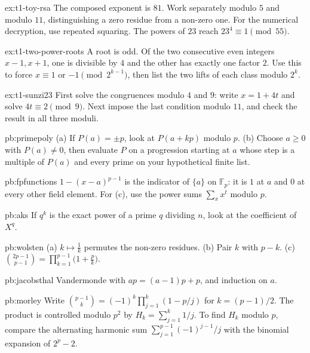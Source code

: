 \begin{hint}{ex:t1-toy-rsa}
The composed exponent is $81$. Work separately modulo $5$ and modulo $11$, distinguishing a zero residue from a non-zero one. For the numerical decryption, use repeated squaring. The powers of $23$ reach $23^4\equiv1\pmod{55}$.
\end{hint}
\begin{hint}{ex:t1-two-power-roots}
A root is odd. Of the two consecutive even integers $x-1,x+1$, one is divisible by $4$ and the other has exactly one factor $2$. Use this to force $x\equiv1$ or $-1\pmod{2^{k-1}}$, then list the two lifts of each class modulo $2^k$.
\end{hint}

\begin{hint}{ex:t1-sunzi23}
First solve the congruences modulo $4$ and $9$: write $x=1+4t$ and solve $4t\equiv2\pmod9$. Next impose the last condition modulo $11$, and check the result in all three moduli.
\end{hint}

\begin{hint}{pb:primepoly}
(a) If $P(a)=\pm p$, look at $P(a+kp)$ modulo $p$. (b) Choose $a\ge0$ with $P(a)\ne0$, then evaluate $P$ on a progression starting at $a$ whose step is a multiple of $P(a)$ and every prime on your hypothetical finite list.
\end{hint}

\begin{hint}{pb:fpfunctions}
$1-(x-a)^{p-1}$ is the indicator of $\{a\}$ on $\mathbb F_p$: it is $1$ at $a$ and $0$ at every other field element. For (c), use the power sums $\sum_xx^t$ modulo $p$.
\end{hint}

\begin{hint}{pb:aks}
If $q^k$ is the exact power of a prime $q$ dividing $n$, look at the coefficient of $X^q$.
\end{hint}

\begin{hint}{pb:wolsten}
(a) $k\mapsto\frac1k$ permutes the non-zero residues. (b) Pair $k$ with $p-k$. (c) $\binom{2p-1}{p-1}=\prod_{k=1}^{p-1}\bigl(1+\frac pk\bigr)$.
\end{hint}

\begin{hint}{pb:jacobsthal}
Vandermonde with $ap=(a-1)p+p$, and induction on $a$.
\end{hint}

\begin{hint}{pb:morley}
Write $\binom{p-1}{k}=(-1)^k\prod_{j=1}^k(1-p/j)$ for
$k=(p-1)/2$. The product is controlled modulo $p^2$ by
$H_k=\sum_{j=1}^k1/j$. To find $H_k$ modulo $p$, compare the
alternating harmonic sum $\sum_{j=1}^{p-1}(-1)^{j-1}/j$
with the binomial expansion of $2^p-2$.
\end{hint}

